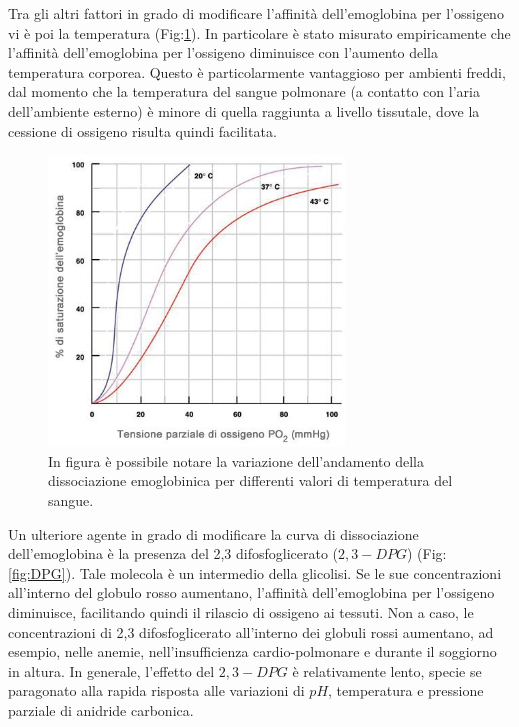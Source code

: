 \documentclass[a4paper, 12pt]{book}
\begin{document}
Tra gli altri fattori in grado di modificare l'affinità dell'emoglobina per l'ossigeno vi è poi la temperatura (Fig:\ref{fig:T}).
In particolare è stato misurato empiricamente che l'affinità dell'emoglobina per l'ossigeno diminuisce con l'aumento della temperatura corporea.
Questo è particolarmente vantaggioso per ambienti freddi, dal momento che la temperatura del sangue polmonare (a contatto con l'aria dell'ambiente esterno) è minore di quella raggiunta a livello tissutale, dove la cessione di ossigeno risulta quindi facilitata.
\begin{figure}[h!]
    \centering
    \includegraphics[width=0.7\textwidth]{emoglobina-temperatura.jpeg}
    \caption{In figura è possibile notare la variazione dell'andamento della dissociazione emoglobinica per differenti valori di temperatura del sangue.}
    \label{fig:T}
\end{figure}
Un ulteriore agente in grado di modificare la curva di dissociazione dell'emoglobina è la presenza del 2,3 difosfoglicerato ($2,3-DPG$) (Fig:\ref{fig:DPG}).
Tale molecola è un intermedio della glicolisi.
Se le sue concentrazioni all'interno del globulo rosso aumentano, l'affinità dell'emoglobina per l'ossigeno diminuisce, facilitando quindi il rilascio di ossigeno ai tessuti.
Non a caso, le concentrazioni di 2,3 difosfoglicerato all'interno dei globuli rossi aumentano, ad esempio, nelle anemie, nell'insufficienza cardio-polmonare e durante il soggiorno in altura.
In generale, l'effetto del $2,3-DPG$ è relativamente lento, specie se paragonato alla rapida risposta alle variazioni di $pH$, temperatura e pressione parziale di anidride carbonica.
\end{document}
